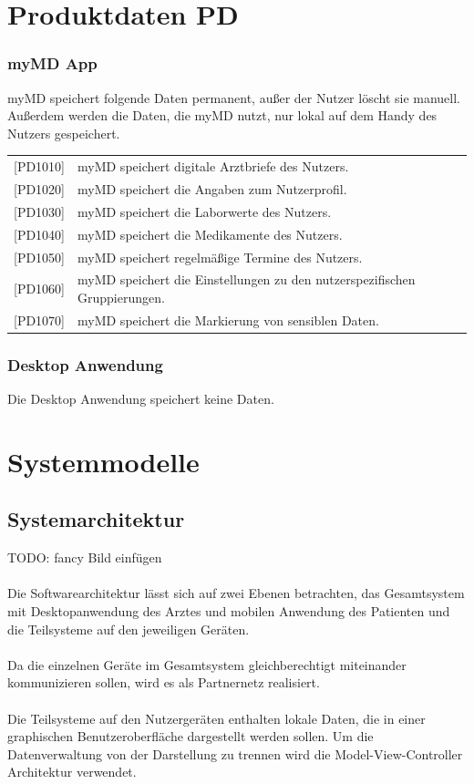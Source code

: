 \documentclass[a4paper]{scrreprt}
\begin{document}
\chapter{Produktdaten PD}
\subsection{myMD \gls{App}}
myMD speichert folgende Daten permanent, außer der Nutzer löscht sie manuell. Außerdem werden die Daten, die myMD nutzt, nur lokal auf dem Handy des Nutzers gespeichert.
\newline
\newline
\begin{tabular}{lll}
[PD1010]&  \multicolumn{2}{p{12cm}}{myMD speichert digitale Arztbriefe des Nutzers.}\\
{[PD1020]} &  \multicolumn{2}{p{12cm}}{myMD speichert die Angaben zum Nutzerprofil.}\\
{[PD1030]} &  \multicolumn{2}{p{12cm}}{myMD speichert die Laborwerte des Nutzers.}\\
{[PD1040]} &  \multicolumn{2}{p{12cm}}{myMD speichert die Medikamente des Nutzers.}  \\
{[PD1050]} &  \multicolumn{2}{p{12cm}}{myMD speichert regelmäßige Termine des Nutzers.}  \\
{[PD1060]} &  \multicolumn{2}{p{12cm}}{myMD speichert die Einstellungen zu den nutzerspezifischen Gruppierungen.}  \\
{[PD1070]} &  \multicolumn{2}{p{12cm}}{myMD speichert die Markierung von sensiblen Daten.}  \\

\end{tabular}

\subsection{\gls{Desktop Anwendung}}
Die \gls{Desktop Anwendung} speichert keine Daten.


\chapter{Systemmodelle}
\section{Systemarchitektur}
TODO: fancy Bild einfügen \\\\
Die Softwarearchitektur lässt sich auf zwei Ebenen betrachten, das Gesamtsystem mit Desktopanwendung des Arztes und mobilen Anwendung des Patienten und die Teilsysteme auf den jeweiligen Geräten. \\\\
Da die einzelnen Geräte im Gesamtsystem gleichberechtigt miteinander kommunizieren sollen, wird es als Partnernetz realisiert.\\\\
Die Teilsysteme auf den Nutzergeräten enthalten lokale Daten, die in einer graphischen Benutzeroberfläche dargestellt werden sollen. Um die Datenverwaltung von der Darstellung zu trennen wird die Model-View-Controller Architektur verwendet.
\end{document}
